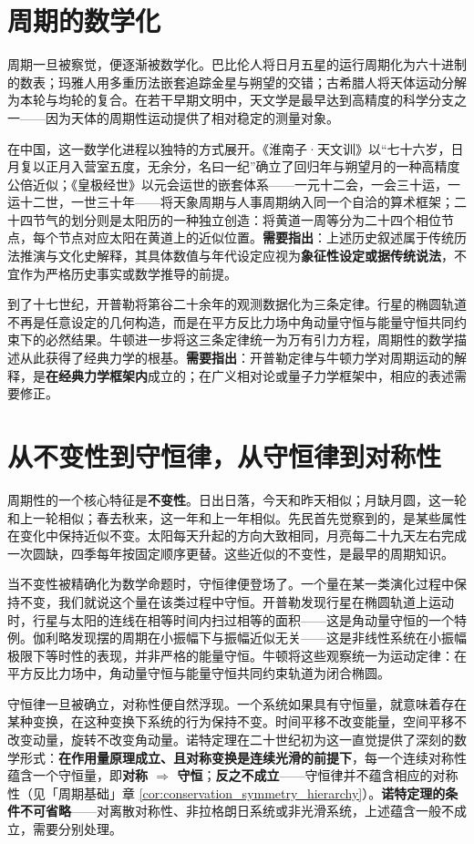 \section*{周期的数学化}

周期一旦被察觉，便逐渐被数学化。巴比伦人将日月五星的运行周期化为六十进制的数表；玛雅人用多重历法嵌套追踪金星与朔望的交错；古希腊人将天体运动分解为本轮与均轮的复合。在若干早期文明中，天文学是最早达到高精度的科学分支之一——因为天体的周期性运动提供了相对稳定的测量对象。

在中国，这一数学化进程以独特的方式展开。《淮南子·天文训》以“七十六岁，日月复以正月入营室五度，无余分，名曰一纪”确立了回归年与朔望月的一种高精度公倍近似；《皇极经世》以元会运世的嵌套体系——一元十二会，一会三十运，一运十二世，一世三十年——将天象周期与人事周期纳入同一个自洽的算术框架；二十四节气的划分则是太阳历的一种独立创造：将黄道一周等分为二十四个相位节点，每个节点对应太阳在黄道上的近似位置。\textbf{需要指出}：上述历史叙述属于传统历法推演与文化史解释，其具体数值与年代设定应视为\textbf{象征性设定或据传统说法}，不宜作为严格历史事实或数学推导的前提。

到了十七世纪，开普勒将第谷二十余年的观测数据化为三条定律。行星的椭圆轨道不再是任意设定的几何构造，而是在平方反比力场中角动量守恒与能量守恒共同约束下的必然结果。牛顿进一步将这三条定律统一为万有引力方程，周期性的数学描述从此获得了经典力学的根基。\textbf{需要指出}：开普勒定律与牛顿力学对周期运动的解释，是\textbf{在经典力学框架内}成立的；在广义相对论或量子力学框架中，相应的表述需要修正。

\section*{从不变性到守恒律，从守恒律到对称性}

周期性的一个核心特征是\textbf{不变性}。日出日落，今天和昨天相似；月缺月圆，这一轮和上一轮相似；春去秋来，这一年和上一年相似。先民首先觉察到的，是某些属性在变化中保持近似不变。太阳每天升起的方向大致相同，月亮每二十九天左右完成一次圆缺，四季每年按固定顺序更替。这些近似的不变性，是最早的周期知识。

当不变性被精确化为数学命题时，守恒律便登场了。一个量在某一类演化过程中保持不变，我们就说这个量在该类过程中守恒。开普勒发现行星在椭圆轨道上运动时，行星与太阳的连线在相等时间内扫过相等的面积——这是角动量守恒的一个特例。伽利略发现摆的周期在小振幅下与振幅近似无关——这是非线性系统在小振幅极限下等时性的表现，并非严格的能量守恒。牛顿将这些观察统一为运动定律：在平方反比力场中，角动量守恒与能量守恒共同约束轨道为闭合椭圆。

守恒律一旦被确立，对称性便自然浮现。一个系统如果具有守恒量，就意味着存在某种变换，在这种变换下系统的行为保持不变。时间平移不改变能量，空间平移不改变动量，旋转不改变角动量。诺特定理在二十世纪初为这一直觉提供了深刻的数学形式：\textbf{在作用量原理成立、且对称变换是连续光滑的前提下}，每一个连续对称性蕴含一个守恒量，即\textbf{对称 $\Rightarrow$ 守恒}；\textbf{反之不成立}——守恒律并不蕴含相应的对称性（见「周期基础」章 \cref{cor:conservation_symmetry_hierarchy}）。\textbf{诺特定理的条件不可省略}——对离散对称性、非拉格朗日系统或非光滑系统，上述蕴含一般不成立，需要分别处理。


